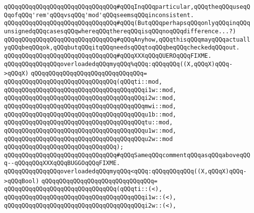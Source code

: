 \verb|qQQqqQQqqQQqqQQqqQQqqQQqqQQqqQQq#qQQqInqQQqparticular,qQQqtheqQQquseqQQqofqQQq'rem'qQQqvsqQQq'mod'qQQqseemsqQQqinconsistent.|\newline
\verb|qQQqqQQqqQQqqQQqqQQqqQQqqQQqqQQq#qQQq(ButqQQqperhapsqQQqonlyqQQqinqQQqunsignedqQQqcasesqQQqwhereqQQqthereqQQqisqQQqnoqQQqdifference...?)|\newline
\verb|qQQqqQQqqQQqqQQqqQQqqQQqqQQqqQQq#qQQqAnyhow,qQQqthisqQQqmayqQQqactuallyqQQqbeqQQqok,qQQqbutqQQqitqQQqneedsqQQqtoqQQqbeqQQqcheckedqQQqout.|\newline
\verb|qQQqqQQqqQQqqQQqqQQqqQQqqQQqqQQq#qQQqXXXqQQqQUEROqQQqFIXME.|\newline
\newline
\verb|qQQqqQQqqQQqqQQqoverloadedqQQqmyqQQq%qQQq:qQQqqQQq((X,qQQqX)qQQq->qQQqX)|\newline
\verb|qQQqqQQqqQQqqQQqqQQqqQQqqQQqqQQq=|\newline
\verb|qQQqqQQqqQQqqQQqqQQqqQQqqQQqqQQq(qQQqti::mod,|\newline
\verb|qQQqqQQqqQQqqQQqqQQqqQQqqQQqqQQqqQQqqQQqi1w::mod,|\newline
\verb|qQQqqQQqqQQqqQQqqQQqqQQqqQQqqQQqqQQqqQQqi2w::mod,|\newline
\verb|qQQqqQQqqQQqqQQqqQQqqQQqqQQqqQQqqQQqqQQqmwi::mod,|\newline
\verb|qQQqqQQqqQQqqQQqqQQqqQQqqQQqqQQqqQQqqQQqu1b::mod,|\newline
\verb|qQQqqQQqqQQqqQQqqQQqqQQqqQQqqQQqqQQqqQQqtu::mod,|\newline
\verb|qQQqqQQqqQQqqQQqqQQqqQQqqQQqqQQqqQQqqQQqu1w::mod,|\newline
\verb|qQQqqQQqqQQqqQQqqQQqqQQqqQQqqQQqqQQqqQQqu2w::mod|\newline
\verb|qQQqqQQqqQQqqQQqqQQqqQQqqQQqqQQq);|\newline
\verb|qQQqqQQqqQQqqQQqqQQqqQQqqQQqqQQq#qQQqSameqQQqcommentqQQqasqQQqaboveqQQq--qQQqqQQqXXXqQQqBUGGOqQQqFIXME.|\newline
\newline
\verb|qQQqqQQqqQQqqQQqoverloadedqQQqmyqQQq<qQQq:qQQqqQQqqQQq((X,qQQqX)qQQq->qQQqBool)|\newline
\verb|qQQqqQQqqQQqqQQqqQQqqQQqqQQqqQQq=|\newline
\verb|qQQqqQQqqQQqqQQqqQQqqQQqqQQqqQQq(qQQqti::(<),|\newline
\verb|qQQqqQQqqQQqqQQqqQQqqQQqqQQqqQQqqQQqqQQqi1w::(<),|\newline
\verb|qQQqqQQqqQQqqQQqqQQqqQQqqQQqqQQqqQQqqQQqi2w::(<),|\newline
